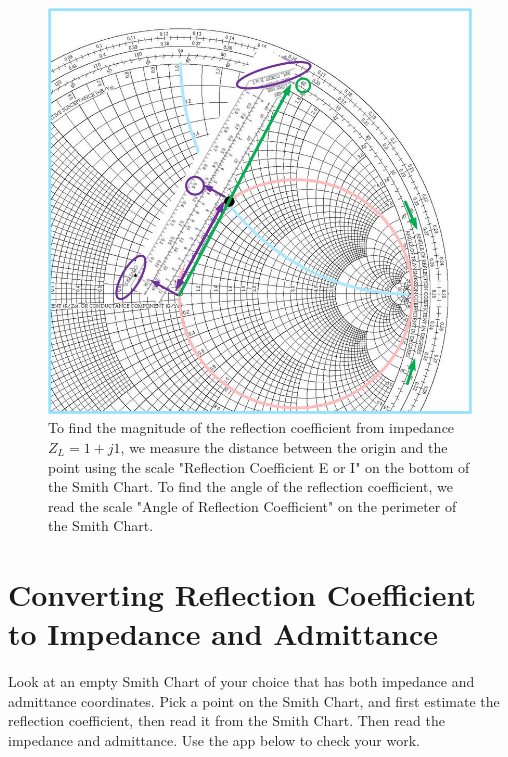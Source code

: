 \documentclass{ximera}
\begin{document}
\begin{figure}[htbp]
\begin{center}
\includegraphics[scale=0.3]{../jpg/FindingGammaFromImpedanceonSC.jpg}
\end{center}
\caption{To find the magnitude of the reflection coefficient from impedance $Z_L=1+j 1$, we measure the distance between the origin and the point using the scale "Reflection Coefficient E or I" on the bottom of the Smith Chart. To find the angle of the reflection coefficient, we read the scale "Angle of Reflection Coefficient" on the perimeter of the Smith Chart.}
\label{fig:SCDerscgammafromZ}
\end{figure}

\section{Converting Reflection Coefficient to Impedance and Admittance}

\begin{example}

Look at an empty Smith Chart of your choice that has both impedance and admittance coordinates. Pick a point on the Smith Chart, and first estimate the reflection coefficient, then read it from the Smith Chart. Then read the impedance and admittance. 
Use the app below to check your work.

\begin{center}  
\end{center} 
\end{example}
\end{document}
